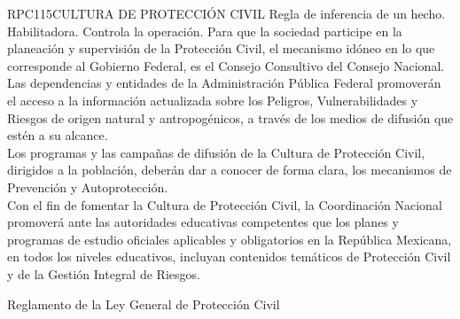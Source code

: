 \begin{BusinessRule}{RPC115}{CULTURA DE PROTECCIÓN CIVIL}{
		Regla de inferencia de un hecho.
	}{
		Habilitadora. 
	}{
		Controla la operación. %
	}
	\BRItem[Descripción:] Para que la sociedad participe en la planeación y supervisión de la Protección Civil, el mecanismo idóneo en lo que corresponde al Gobierno Federal, es el Consejo Consultivo del Consejo Nacional.\\Las dependencias y entidades de la Administración Pública Federal promoverán el acceso a la información actualizada sobre los Peligros, Vulnerabilidades y Riesgos de origen natural y antropogénicos, a través de los medios de difusión que estén a su alcance.\\Los programas y las campañas de difusión de la Cultura de Protección Civil, dirigidos a la población, deberán dar a conocer de forma clara, los mecanismos de Prevención y Autoprotección.\\Con el fin de fomentar la Cultura de Protección Civil, la Coordinación Nacional promoverá ante las autoridades educativas competentes que los planes y programas de estudio oficiales aplicables y obligatorios en la República Mexicana, en todos los niveles educativos, incluyan contenidos temáticos de Protección Civil y de la Gestión Integral de Riesgos.
	
	
	 Reglamento de la Ley General de Protección Civil
\end{BusinessRule}